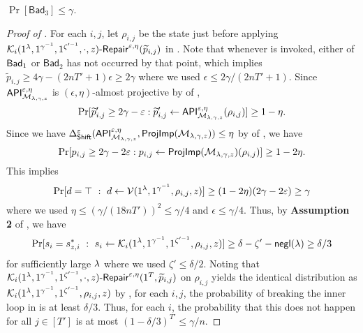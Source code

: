 \begin{lemma}\label{lem:bad_3}
$\Pr[\mathsf{Bad}_3]\le \gamma$.
\end{lemma}
\begin{proof}[Proof of ]
   For each $i,j$, let $\rho_{i,j}$ be the state just before applying 
$\mathcal{K}_i(1^\lambda,1^{\gamma^{-1}},1^{\zeta'^{-1}},\cdot,z)\text{-}\mathsf{Repair}^{\varepsilon,\eta}(\widetilde{p}_{i,j})$ in
 . 
 Note that whenever  is invoked, either of $\mathsf{\mathsf{Bad}}_1$ or $\mathsf{Bad}_2$ has not occurred by that point, which implies $\tilde{p}_{i,j}\ge 4\gamma-(2nT'+1)\epsilon \ge 2\gamma$ where we used $\epsilon\le 2\gamma/(2nT'+1)$.  
 Since $\mathsf{API}_{\mathcal{M}_{\lambda,\gamma,z}}^{\varepsilon,\eta}$ is $(\epsilon,\eta)$-almost projective by  of , 
 $$
 \Pr[
 \widetilde{p}'_{i,j}\ge 2\gamma- \varepsilon
 :
 \widetilde{p}'_{i,j}\gets \mathsf{API}_{\mathcal{M}_{\lambda,\gamma,z}}^{\varepsilon,\eta}(\rho_{i,j})]\ge 1-\eta.
 $$
 Since we have $\Delta_{\mathsf{Shift}}^{\varepsilon}(\mathsf{API}_{\mathcal{M}_{\lambda,\gamma,z}}^{\varepsilon,\eta},\mathsf{ProjImp}(\mathcal{M}_{\lambda,\gamma,z}))\le \eta$ by  of , we have  
  $$
 \Pr[
 p_{i,j}\ge 2\gamma- 2\varepsilon
 :
 p_{i,j}\gets \mathsf{ProjImp}(\mathcal{M}_{\lambda,\gamma,z})(\rho_{i,j})]\ge 1-2\eta.
 $$
 This implies 
 $$
 \Pr[d=\top ~:~ d \leftarrow \mathcal{V}(1^\lambda,1^{\gamma^{-1}},\rho_{i,j},{z})]\geq (1-2\eta)(2\gamma- 2\varepsilon)
 \ge \gamma
 $$
 where we used $\eta\le \left( \gamma/(18nT')\right)^2\le \gamma/4$ and $\epsilon\le \gamma/4$. 
Thus, by {\bf Assumption 2} of , %
we have 
$$
\Pr[s_i =s^*_{{z,i}}~:~ s_i\leftarrow \mathcal{K}_i(1^\lambda,1^{\gamma^{-1}}, 1^{\zeta'^{-1}}, \rho_{i,j},{z})]\geq   \delta-\zeta'-\mathsf{negl}(\lambda) \ge \delta/3
$$
for sufficiently large $\lambda$ 
where we used $\zeta'\le \delta/2$. %
Noting that $\mathcal{K}_i(1^\lambda,1^{\gamma^{-1}},1^{\zeta'^{-1}},\cdot,z)\text{-}\mathsf{Repair}^{\varepsilon,\eta}(1^T,\widetilde{p}_{i,j})$ on $\rho_{i,j}$ yields the identical distribution as  $\mathcal{K}_i(1^\lambda,1^{\gamma^{-1}}, 1^{\zeta'^{-1}}, \rho_{i,j},{z})$ by  , for each $i,j$, the probability of breaking the inner loop in  is at least $\delta/3$. Thus, for each $i$, the probability that this does not happen for all $j\in [T']$ is at most $(1-\delta/3)^{T'}\le \gamma/n$.  %

\end{proof}
